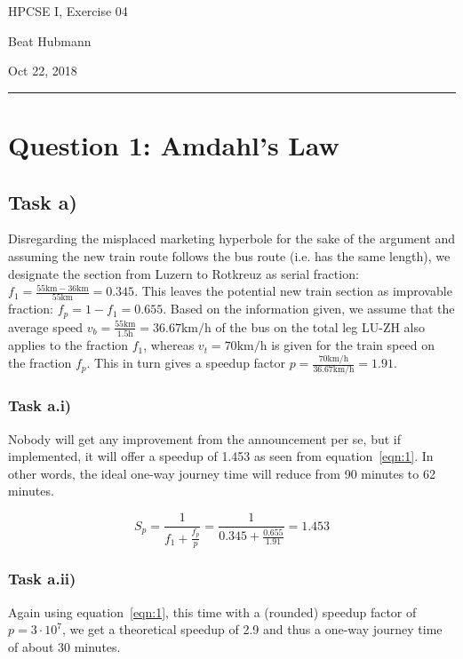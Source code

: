 \documentclass[11pt,a4paper]{article}
\begin{document}
\noindent\parbox{\linewidth}{
 \parbox{.25\linewidth}{ \large HPCSE I, Exercise 04 }\hfill
 \parbox{.5\linewidth}{\begin{center} \large Beat Hubmann \end{center}}\hfill
 \parbox{.2\linewidth}{\begin{flushright} \large Oct 22, 2018 \end{flushright}}
}
\noindent\rule{\linewidth}{2pt}

\section{Question 1: Amdahl's Law}

\subsection{Task a)}
Disregarding the misplaced marketing hyperbole for the sake of the argument and assuming the new train route follows the bus route (i.e. has the same length),
 we designate the section from Luzern to Rotkreuz as serial fraction:
$f_1 = \frac{55 \text{km} - 36 \text{km}}{55 \text{km}} = 0.345$. This leaves the potential new train section as improvable fraction: $f_p = 1 - f_1 = 0.655$.
Based on the information given, we assume that the average speed $v_b = \frac{55 \text{km}}{1.5 \text{h}} = 36.67 \text{km/h} $ of the bus 
on the total leg LU-ZH also applies to the fraction $f_1$, whereas $v_t = 70 \text{km/h}$ is given for the train speed on the fraction $f_p$.
This in turn gives a speedup factor $p = \frac{70 \text{km/h}}{36.67 \text{km/h}} = 1.91$.

\subsubsection{Task a.i)}
Nobody will get any improvement from the announcement per se, but if implemented, it will offer a speedup of 1.453 as seen from equation~\ref{eqn:1}.
In other words, the ideal one-way journey time will reduce from 90 minutes to 62 minutes.

\begin{equation}
    S_p = \frac{1}{f_1 + \frac{f_p}{p}} = \frac{1}{0.345 + \frac{0.655}{1.91}} = 1.453
\label{eqn:1}
\end{equation}

\subsubsection{Task a.ii)}
Again using equation~\ref{eqn:1}, this time with a (rounded) speedup factor of $p = 3 \cdot 10^7$, we get a theoretical speedup of 2.9 and thus
a one-way journey time of about 30 minutes.
\end{document}
